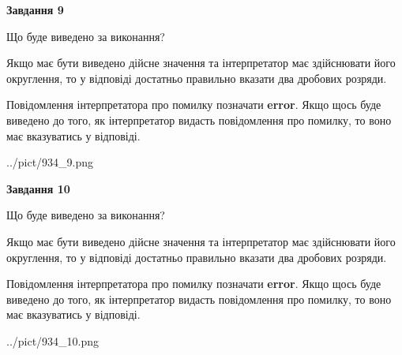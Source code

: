 \documentclass[12pt, ukrainian]{article}
\begin{document}
{\begin {Large}
{\begin {center}\textbf{Завдання 9}\end {center}}\par
Що буде виведено за виконання? \par

Якщо має бути виведено дійсне значення та інтерпретатор має здійснювати його округлення, 
то у відповіді достатньо правильно вказати два дробових розряди.

Повідомлення інтерпретатора про помилку позначати \textbf{error}.
Якщо щось буде виведено до того, як інтерпретатор видасть повідомлення про помилку, 
то воно має вказуватись у відповіді. \par

\begin{center}
	{../pict/934_9.png}
\end{center}
\newpage

{\begin {center}\textbf{Завдання 10}\end {center}}\par
Що буде виведено за виконання? \par

Якщо має бути виведено дійсне значення та інтерпретатор має здійснювати його округлення, 
то у відповіді достатньо правильно вказати два дробових розряди.

Повідомлення інтерпретатора про помилку позначати \textbf{error}.
Якщо щось буде виведено до того, як інтерпретатор видасть повідомлення про помилку, 
то воно має вказуватись у відповіді. \par

\begin{center}
	{../pict/934_10.png}
\end{center}
\newpage

\end {Large}}
\end{document}
